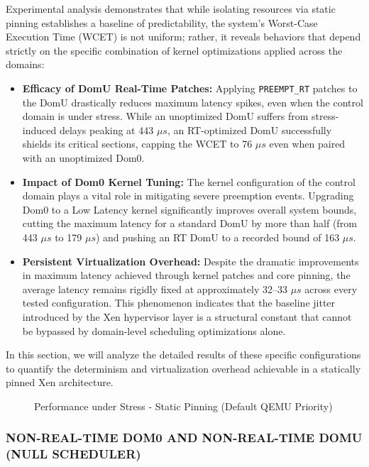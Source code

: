 Experimental analysis demonstrates that while isolating resources via
static pinning establishes a baseline of predictability, the system's
Worst-Case Execution Time (WCET) is not uniform; rather, it reveals
behaviors that depend strictly on the specific combination of kernel
optimizations applied across the domains:

\begin{itemize}
\item
  \textbf{Efficacy of DomU Real-Time Patches:} Applying
  \texttt{PREEMPT\_RT} patches to the DomU drastically reduces maximum
  latency spikes, even when the control domain is under stress. While an
  unoptimized DomU suffers from stress-induced delays peaking at 443 $\mu s$,
  an RT-optimized DomU successfully shields its critical sections,
  capping the WCET to 76 $\mu s$ even when paired with an unoptimized Dom0.
\item
  \textbf{Impact of Dom0 Kernel Tuning:} The kernel configuration of the
  control domain plays a vital role in mitigating severe preemption
  events. Upgrading Dom0 to a Low Latency kernel significantly improves
  overall system bounds, cutting the maximum latency for a standard DomU
  by more than half (from 443 $\mu s$ to 179 $\mu s$) and pushing an RT DomU to a
  recorded bound of 163 $\mu s$.
\item
  \textbf{Persistent Virtualization Overhead:} Despite the dramatic
  improvements in maximum latency achieved through kernel patches and
  core pinning, the average latency remains rigidly fixed at
  approximately 32--33 $\mu s$ across every tested configuration. This
  phenomenon indicates that the baseline jitter introduced by the Xen
  hypervisor layer is a structural constant that cannot be bypassed by
  domain-level scheduling optimizations alone.
\end{itemize}

In this section, we will analyze the detailed results of these specific
configurations to quantify the determinism and virtualization overhead
achievable in a statically pinned Xen architecture.

\begin{figure}
\centering

\caption{Performance under Stress - Static Pinning (Default QEMU
Priority)}
\end{figure}

\subsubsection{NON-REAL-TIME DOM0 AND NON-REAL-TIME DOMU (NULL
SCHEDULER)}\label{non-real-time-dom0-and-non-real-time-domu-null-scheduler-1}

